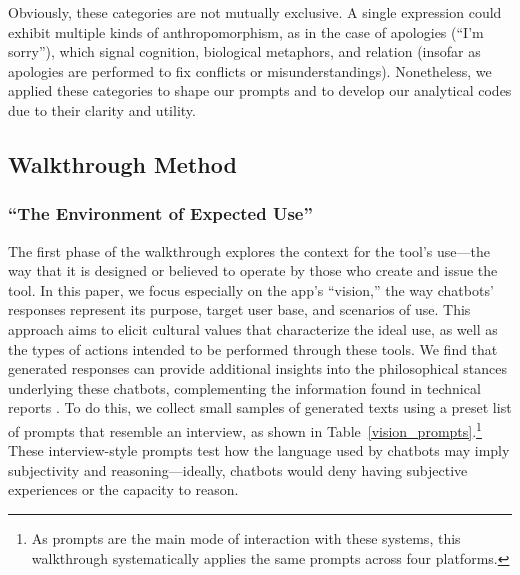 \vspace{3mm}

Obviously, these categories are not mutually exclusive. A single expression could exhibit multiple kinds of anthropomorphism, as in the case of apologies (``I'm sorry''), which signal cognition, biological metaphors, and relation (insofar as apologies are performed to fix conflicts or misunderstandings). Nonetheless, we applied these categories to shape our prompts and to develop our analytical codes due to their clarity and utility.


\subsection{Walkthrough Method}

\subsubsection{``The Environment of Expected Use''}

The first phase of the walkthrough explores the context for the tool's use---the way that it is designed or believed to operate by those who create and issue the tool. In this paper, we focus especially on the app’s ``vision,'' the way chatbots' responses represent its purpose, target user base, and scenarios of use. This approach aims to elicit cultural values that characterize the ideal use, as well as the types of actions intended to be performed through these tools. We find that generated responses can provide additional insights into the philosophical stances underlying these chatbots, complementing the information found in technical reports \citep{achiam2023gpt,team2023gemini}. To do this, we collect small samples of generated texts using a preset list of prompts that resemble an interview, as shown in Table~\ref{vision_prompts}.\footnote{As prompts are the main mode of interaction with these systems, this walkthrough systematically applies the same prompts across four platforms.} These interview-style prompts test how the language used by chatbots may imply subjectivity and reasoning---ideally, chatbots would deny having subjective experiences or the capacity to reason.

